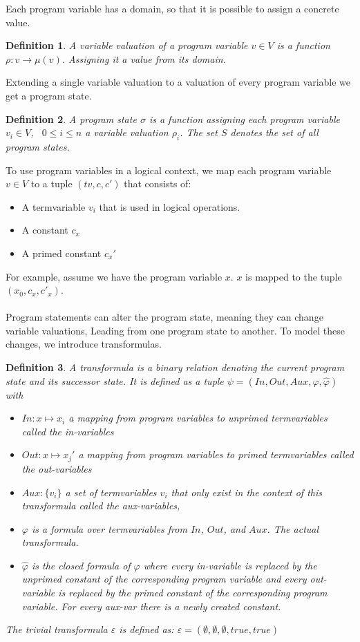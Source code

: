 \documentclass{article}
\newcommand{\tf}{\ensuremath{\varphi}\xspace}
\newcommand{\ctf}{\ensuremath{\widehat{\varphi}}\xspace}
\newcommand{\invars}{\ensuremath{In}\xspace}
\newcommand{\outvars}{\ensuremath{Out}\xspace}
\newcommand{\auxvars}{\ensuremath{Aux}\xspace}
\newtheorem{mydef}{Definition}
\begin{document}
Each program variable has a domain, so that it is possible to assign a concrete value.
\begin{mydef}
	A variable valuation of a program variable $v \in V$ is a function $\rho: v \rightarrow \mu(v)$.  Assigning it a value from its domain.
\end{mydef}
Extending a single variable valuation to a valuation of every program variable we get a program state.
\begin{mydef}
	A program state $\sigma$ is a function assigning each program variable $v_i \in V$, \ $0 \leq i \leq n$ a variable valuation $\rho_i$. The set $S$ denotes the set of all program states.
\end{mydef}
To use program variables in a logical context, we map each program variable $v \in V$ to a tuple $(tv, c, c')$ that consists of: 
	\begin{itemize}
		\item A termvariable $v_i$ that is used in logical operations.
		\item A constant $c_x$
		\item A primed constant $c_x'$
\end{itemize}
For example, assume we have the program variable $x$. $x$ is mapped to the tuple $(x_0, c_x, c'_x)$.  \\ \\
Program statements can alter the program state, meaning they can change variable valuations, Leading from one program state to another. To model these changes, we introduce transformulas.
\begin{mydef}
	A transformula is a binary relation denoting the current program state and its successor state. It is defined as a tuple $\psi = (\invars, \outvars, \auxvars, \tf, \ctf)$ with 
	\begin{itemize}
		\item $\invars : x \mapsto x_i$ a mapping from program variables to unprimed termvariables called the in-variables
		\item $\outvars : x \mapsto x_j'$ a mapping from program variables to primed termvariables called the out-variables
		\item $\auxvars: \{ v_i \}$ a set of termvariables $v_i$ that only exist in the context of this transformula called the aux-variables,
		\item $\tf$ is a formula over termvariables from $\invars$, $\outvars$, and $\auxvars$. The actual transformula.
		\item $\ctf$ is the closed formula of $\tf$ where every in-variable is replaced by the unprimed constant of the corresponding program variable and every out-variable is replaced by the primed constant of the corresponding program variable. For every aux-var there is a newly created constant.
	\end{itemize}
The trivial transformula $\varepsilon$ is defined as: $\varepsilon = (\emptyset, \emptyset, \emptyset, true, true)$
\end{mydef}
%
\end{document}
